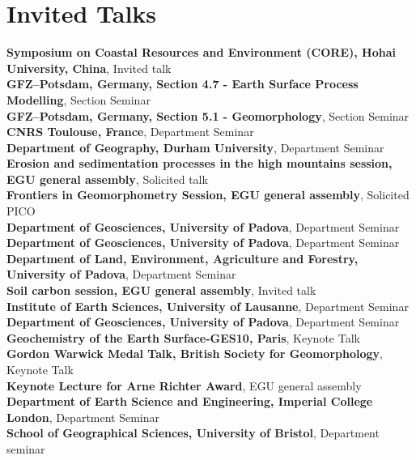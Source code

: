 \documentclass[10pt, a4paper]{article}
\newcommand{\years}[1]{\marginnote{\scriptsize #1}}
\begin{document}
\section*{Invited Talks}
\years{2018}\textbf{Symposium on Coastal Resources and Environment (CORE), Hohai University, China}, Invited talk\\[0.05cm]
\textbf{GFZ--Potsdam, Germany, Section 4.7 - Earth Surface Process Modelling}, Section Seminar\\[0.05cm]
\textbf{GFZ--Potsdam, Germany, Section 5.1 - Geomorphology}, Section Seminar\\[0.05cm]
\years{2017}\textbf{CNRS Toulouse, France}, Department Seminar\\[0.05cm]
\textbf{Department of Geography, Durham University}, Department Seminar\\[0.05cm]
\years{2016}\textbf{Erosion and sedimentation processes in the high mountains session, EGU general assembly}, Solicited talk\\[0.05cm]
\textbf{Frontiers in Geomorphometry Session, EGU general assembly}, Solicited PICO\\[0.05cm]
\textbf{Department of Geosciences, University of Padova}, Department Seminar\\[0.05cm]
\textbf{Department of Geosciences, University of Padova}, Department Seminar\\[0.05cm]
\years{2015}\textbf{Department of Land, Environment, Agriculture and Forestry, University of Padova}, Department Seminar\\[0.05cm]
\years{2014}\textbf{Soil carbon session, EGU general assembly}, Invited talk\\[0.05cm]
\textbf{Institute of Earth Sciences, University of Lausanne}, Department Seminar\\[0.05cm]
\textbf{Department of Geosciences, University of Padova}, Department Seminar\\[0.05cm]
\textbf{Geochemistry of the Earth Surface-GES10, Paris}, Keynote Talk\\[0.05cm]
\textbf{Gordon Warwick Medal Talk, British Society for Geomorphology}, Keynote Talk\\[0.05cm]
\years{2013}\textbf{Keynote Lecture for Arne Richter Award}, EGU general assembly\\[0.05cm]
\textbf{Department of Earth Science and Engineering, Imperial College London},  Department Seminar\\[0.05cm]
\textbf{School of Geographical Sciences, University of Bristol}, Department seminar\\[0.05cm]  
\end{document}
